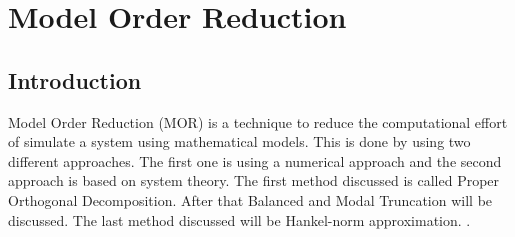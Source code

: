 \nopagebreak
\chapter{Model Order Reduction}
\section{Introduction}
Model Order Reduction (MOR) is a technique to reduce the computational effort of simulate a system using mathematical models.
This is done by using two different approaches. The first one is using a numerical approach and the second approach is based on system theory.
The first method discussed is called Proper Orthogonal Decomposition. After that Balanced and Modal Truncation will be discussed.
The last method discussed will be Hankel-norm approximation.
\cite{+2021}.
\nopagebreak

